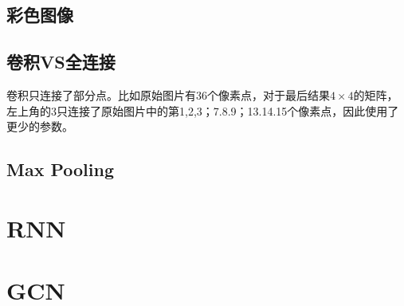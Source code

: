 \documentclass{ctexart}
\begin{document}
	\subsection{彩色图像}
	\subsection{卷积VS全连接}
	卷积只连接了部分点。比如原始图片有36个像素点，对于最后结果$ 4 \times 4 $的矩阵，左上角的3只连接了原始图片中的第1,2,3；7.8.9；13.14.15个像素点，因此使用了更少的参数。
	\subsection{Max Pooling}
	\section{RNN}
	\section{GCN}
\end{document}
